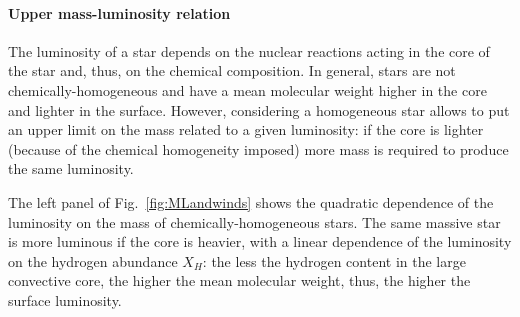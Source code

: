\documentclass[a4paper,titlepage]{book}     	%
\begin{document}
\paragraph{Upper mass-luminosity relation} The luminosity of a star depends on the nuclear reactions acting in the core of the star and, thus, on the chemical composition. In general, stars are not chemically-homogeneous and have a mean molecular weight higher in the core and lighter in the surface. However, considering a homogeneous star allows to put an upper limit on the mass related to a given luminosity: if the core is lighter (because of the chemical homogeneity imposed) more mass is required to produce the same luminosity. 

The left panel of Fig.\ \ref{fig:MLandwinds} shows the quadratic dependence of the luminosity on the mass of chemically-homogeneous stars. The same massive star is more luminous if the core is heavier, with a linear dependence of the luminosity on the hydrogen abundance $X_H$: the less the hydrogen content in the large convective core, the higher the mean molecular weight, thus, the higher the surface luminosity. \cite{Grafener2011_M-L_WR}
 
\end{document}

